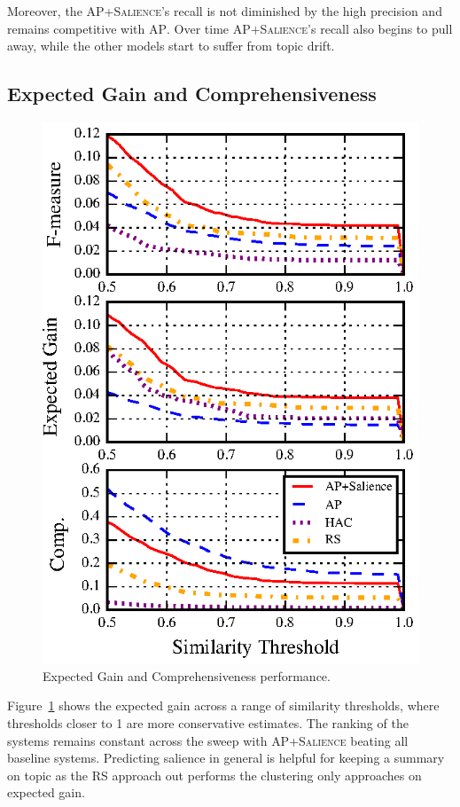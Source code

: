 Moreover, the \textsc{AP+Salience}'s recall is not diminished by the high 
precision and remains competitive with \textsc{AP}. Over time 
\textsc{AP+Salience}'s recall also begins to pull away, while the other models
start to suffer from topic drift.


\subsection{Expected Gain and Comprehensiveness}
\begin{figure}[h]
  \includegraphics[]{nuggets-metrics2.eps}
\caption{Expected Gain and Comprehensiveness performance.}
\label{fig:nperf}
\end{figure}


Figure~\ref{fig:nperf} shows the expected gain across a range of similarity 
thresholds, where thresholds closer to 1 are more conservative estimates. 
The ranking of the systems remains constant across the sweep with 
\textsc{AP+Salience} beating all baseline systems. Predicting salience in 
general is helpful for keeping a summary on topic as the \textsc{RS} approach 
out performs the clustering only approaches on expected gain.



